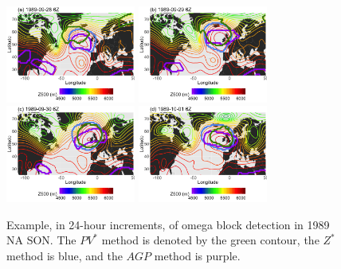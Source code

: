 \documentclass[smallextended]{svjour3}       %
\numberwithin{equation}{section}
\begin{document}
\begin{figure}
\centering
\includegraphics[width=0.38\textwidth]{fig12a}
\includegraphics[width=0.38\textwidth]{fig12b}\\
\includegraphics[width=0.38\textwidth]{fig12c}
\includegraphics[width=0.38\textwidth]{fig12d}
\caption{Example, in 24-hour increments, of omega block detection in 1989 NA SON. The $PV^*$ method is denoted by the green contour, the $Z^*$ method is blue, and the $AGP$ method is purple.}\label{pvdiff}
\end{figure}
\end{document}
